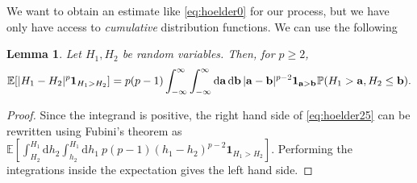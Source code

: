 \documentclass[letterpaper,reqno,11pt,oneside,final]{amsart}
\newtheorem{lem}[thm]{Lemma}
\theoremstyle{definition}
\newcommand{\fb}{\mathbf{b}}
\newcommand{\pp}{\mathbb{P}}
\newcommand{\ee}{\mathbb{E}}
\newcommand{\uno}[1]{\mathbf{1}_{#1}}
\newcommand{\tts}{\hspace{0.05em}}
\renewcommand{\d}{\mathrm{d}}
\newcommand{\fa}{\mathbf{a}}
\numberwithin{equation}{section}
\begin{document}
We want to obtain an estimate like \eqref{eq:hoelder0} for our process, but we have only have access to \emph{cumulative} distribution functions.
We can use the following
\begin{lem} \label{lem:b2} Let $H_1,H_2$ be random variables.  Then, for $p\ge 2$, 
\begin{equation}
\ee\!\left[ |H_1-H_2|^p\uno{H_1>H_2}\right] = p(p-1) \int_{-\infty}^\infty\int_{-\infty}^\infty\d\fa\, \d\fb\,|\fa-\fb|^{p-2}\uno{\fa>\fb} \tts\pp(H_1>\fa,H_2\le \fb).\label{eq:hoelder25}
\end{equation}
\end{lem}\begin{proof}  Since the integrand is positive, the right hand side of \eqref{eq:hoelder25} can be rewritten using Fubini's theorem as
$\ee\!\left[\int_{H_2}^{H_1}\d h_2 \int_{h_2}^{H_1}\d h_1 ~ p(p-1)(h_1-h_2)^{p-2}\uno{H_1>H_2}\right]$.
Performing the integrations inside the expectation gives the left hand side.
\end{proof}
\end{document}
